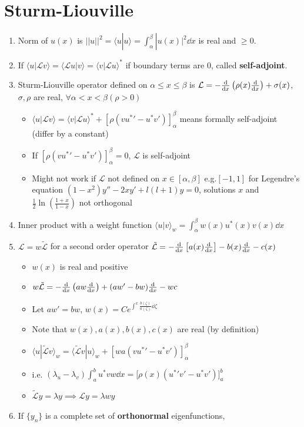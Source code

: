 \documentclass{article}
\theoremstyle{remark}
\theoremstyle{remark}
\begin{document}
    \section*{Sturm-Liouville}
    \begin{enumerate}
        \item Norm of $u(x)$ is $||u||^2 = \langle u|u\rangle = \int_\alpha^\beta|u(x)|^2\dd x$ is real and $\geq0$.
        \item If $\langle u|\mathcal{L}v\rangle = \langle \mathcal{L} u|v\rangle = \langle v|\mathcal{L}u\rangle^*$ if boundary terms are 0, called \textbf{self-adjoint}.
        \item Sturm-Liouville operator defined on $\alpha\leq x\leq\beta$ is $\mathcal{L}=-\dv{x}\left(\rho(x)\dv{x}\right)+\sigma(x)$, $\sigma,\rho$ are real, $\forall\alpha<x<\beta(\rho>0)$\begin{itemize}
            \item $\langle u|\mathcal{L}v\rangle = \langle v|\mathcal{L} u\rangle^* + [\rho(v{u^{*}}'-u^*v')]^\beta_\alpha$ means formally self-adjoint (differ by a constant)
            \item If $[\rho(v{u^{*}}'-u^*v')]^\beta_\alpha = 0$, $\mathcal{L}$ is self-adjoint
            \item Might not work if $\mathcal{L}$ not defined on $x\in[\alpha,\beta]$ e.g.$[-1,1]$ for Legendre's equation $(1-x^2)y''-2xy'+l(l+1)y=0$, solutions $x$ and $\frac{1}{2}\ln(\frac{1+x}{1-x})$ not orthogonal
        \end{itemize}
        \item Inner product with a weight function $\langle u|v\rangle_w = \int_\alpha^\beta w(x)u^*(x)v(x)\dd x$
        \item $\mathcal{L}=w\tilde{\mathcal{L}}$ for a second order operator $\tilde{\mathcal{L}}=-\dv{x}\left[a(x)\dv{x}\right]-b(x)\dv{x}-c(x)$\begin{itemize}
            \item $w(x)$ is real and positive
            \item $w\tilde{\mathcal{L}}=-\dv{x}\left(aw\dv{x}\right)+(aw'-bw)\dv{x}-wc$
            \item Let $aw'=bw$, $w(x)=Ce^{\int^x\frac{b(\zeta)}{a(\zeta)}\dd \zeta}$
            \item Note that $w(x),a(x),b(x),c(x)$ are real (by definition)
            \item $\langle u|\tilde{\mathcal{L}}v\rangle_w = \langle \tilde{\mathcal{L}} v| u\rangle_w + [wa(v{u^{*}}'-u^*v')]^\beta_\alpha$
            \item i.e. $\boxed{(\lambda_u-\lambda_v)\int_a^b u^*vw\dd x=\bigg[\rho(x)({u^*}'v'-u^*v')\bigg]_a^b}$
            \item $\tilde{\mathcal{L}} y=\lambda y\implies \mathcal{L}y=\lambda wy$
        \end{itemize}
        \item If $\{y_n\}$ is a complete set of \textbf{orthonormal} eigenfunctions,
        

\end{enumerate}
\end{document}
